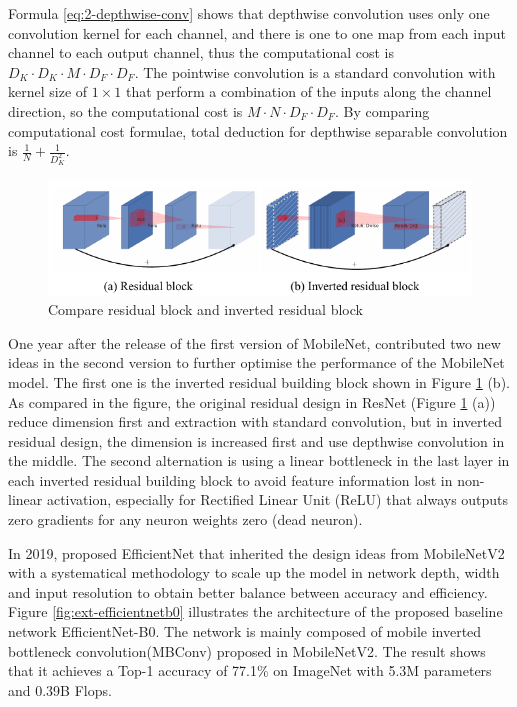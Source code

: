 Formula \ref{eq:2-depthwise-conv} shows that depthwise convolution uses only one convolution kernel for each channel, and there is one to one map from each input channel to each output channel, thus the computational cost is $D_K \cdot D_K \cdot M \cdot D_F \cdot D_F$.
The pointwise convolution is a standard convolution with kernel size of $1\times1$ that perform a combination of the inputs along the channel direction, so the computational cost is $M \cdot N \cdot D_F \cdot D_F$.
By comparing computational cost formulae, total deduction for depthwise separable convolution is $\frac{1}{N}+\frac{1}{D_{K}^{2}}$.

\begin{figure}[!ht]
    \centering
    \includegraphics[width=.85\textwidth]{literature/imgs/ext-inverted-residual.pdf}
    \caption{Compare residual block and inverted residual block \cite{sandler2018mobilenetv2}}
    \label{fig:ext-inverted-residual}
\end{figure}

One year after the release of the first version of MobileNet, \citet{sandler2018mobilenetv2} contributed two new ideas in the second version to further optimise the performance of the MobileNet model.
The first one is the inverted residual building block shown in Figure \ref{fig:ext-inverted-residual} (b).
As compared in the figure, the original residual design in ResNet (Figure \ref{fig:ext-inverted-residual} (a)) reduce dimension first and extraction with standard convolution, but in inverted residual design, the dimension is increased first and use depthwise convolution in the middle.
The second alternation is using a linear bottleneck in the last layer in each inverted residual building block to avoid feature information lost in non-linear activation, especially for Rectified Linear Unit (ReLU) that always outputs zero gradients for any neuron weights zero (dead neuron).

In 2019, \citet{tan2020efficientnet} proposed EfficientNet that inherited the design ideas from MobileNetV2 with a systematical methodology to scale up the model in network depth, width and input resolution to obtain better balance between accuracy and efficiency.
Figure \ref{fig:ext-efficientnetb0} illustrates the architecture of the proposed baseline network EfficientNet-B0.
The network is mainly composed of mobile inverted bottleneck convolution(MBConv) proposed in MobileNetV2.
The result shows that it achieves a Top-1 accuracy of 77.1\% on ImageNet with 5.3M parameters and 0.39B Flops.

